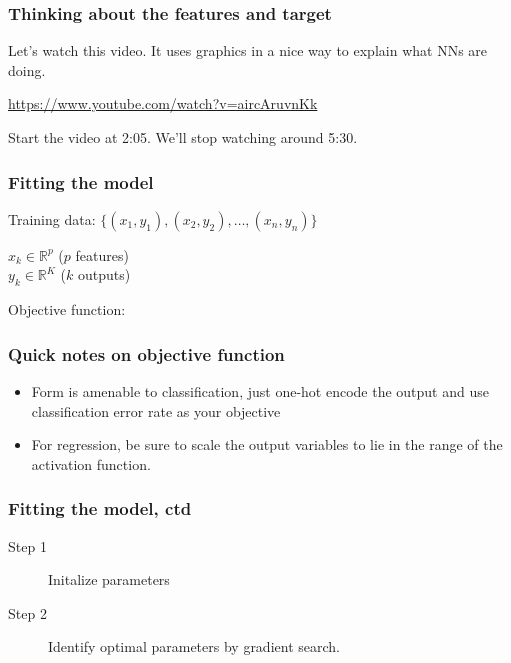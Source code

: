 \documentclass[mathserif, aspectratio=169]{beamer}
\begin{document}
\begin{frame}[t]\frametitle{Thinking about the features and target}
    Let's watch this video.  It uses graphics in a nice way to explain what NNs are doing. 
    \vspace{10mm}

    \url{https://www.youtube.com/watch?v=aircAruvnKk}

    \vspace{10mm}

    Start the video at 2:05.  We'll stop watching around 5:30.
\end{frame}


\begin{frame}[t]\frametitle{Fitting the model}
	Training data: $\{(x_1,y_1), (x_2,y_2), \hdots, (x_n,y_n)\}$

	\vspace{5mm}

	$x_k \in \mathbb{R}^p$ ($p$ features)\\
	$y_k \in \mathbb{R}^K$ ($k$ outputs)

	Objective function: 

\end{frame}

\begin{frame}[t]\frametitle{Quick notes on objective function}
    
	\begin{itemize}
	 	\item Form is amenable to classification, just one-hot encode the output and use classification error rate as your objective
	 	\item For regression, be sure to scale the output variables to lie in the range of the activation function.  
	\end{itemize} 

\end{frame}

\begin{frame}[t]\frametitle{Fitting the model, ctd}
	\begin{description}
		\item[Step 1] Initalize parameters
		\item[Step 2] Identify optimal parameters by gradient search.
	\end{description}
\end{frame}
\end{document}
